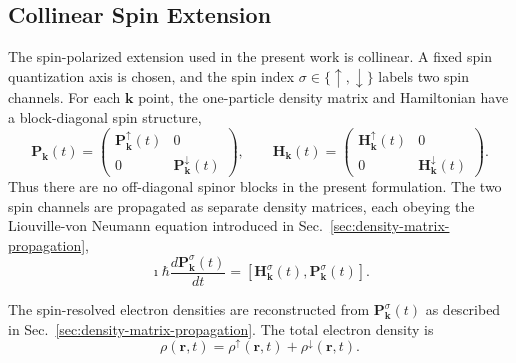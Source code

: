 \subsection{Collinear Spin Extension}
\label{sec:collinear-spin-extension}

The spin-polarized extension used in the present work is collinear.
A fixed spin quantization axis is chosen, and the spin index
$\sigma\in\{\uparrow,\downarrow\}$ labels two spin channels.  For each
$\mathbf k$ point, the one-particle density matrix and Hamiltonian have
a block-diagonal spin structure,
\begin{equation}
  \mathbf P_{\mathbf k}(t)
  =
  \begin{pmatrix}
    \mathbf P_{\mathbf k}^{\uparrow}(t) & 0 \\
    0 & \mathbf P_{\mathbf k}^{\downarrow}(t)
  \end{pmatrix},
  \qquad
  \mathbf H_{\mathbf k}(t)
  =
  \begin{pmatrix}
    \mathbf H_{\mathbf k}^{\uparrow}(t) & 0 \\
    0 & \mathbf H_{\mathbf k}^{\downarrow}(t)
  \end{pmatrix}.
  \label{eq:collinear_spin_block_structure}
\end{equation}
Thus there are no off-diagonal spinor blocks in the present formulation.
The two spin channels are propagated as separate density matrices, each
obeying the Liouville-von Neumann equation introduced in
Sec.~\ref{sec:density-matrix-propagation},
\begin{equation}
  \imath\hbar
  \frac{d\mathbf P_{\mathbf k}^{\sigma}(t)}{dt}
  =
  \left[
    \mathbf H_{\mathbf k}^{\sigma}(t),
    \mathbf P_{\mathbf k}^{\sigma}(t)
  \right].
  \label{eq:lvn_collinear_spin}
\end{equation}

The spin-resolved electron densities are reconstructed from
$\mathbf P_{\mathbf k}^{\sigma}(t)$ as described in
Sec.~\ref{sec:density-matrix-propagation}.  The total electron density is
\begin{equation}
  \rho(\mathbf r,t)
  =
  \rho^{\uparrow}(\mathbf r,t)
  +
  \rho^{\downarrow}(\mathbf r,t).
  \label{eq:total_density_spin}
\end{equation}

